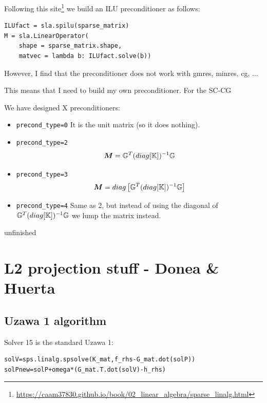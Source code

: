 Following this site\footnote{\url{https://caam37830.github.io/book/02_linear_algebra/sparse_linalg.html}}
we build an ILU preconditioner as follows:
\begin{lstlisting}
ILUfact = sla.spilu(sparse_matrix)
M = sla.LinearOperator(
    shape = sparse_matrix.shape,
    matvec = lambda b: ILUfact.solve(b))
\end{lstlisting}
However, I find that the preconditioner does not work with gmres, minres, cg, ...

This means that I need to build my own preconditioner. 
For the SC-CG 

We have designed X preconditioners:
\begin{itemize}
\item {\tt precond\_type=0} It is the unit matrix (so it does nothing). 

\item {\tt precond\_type=2}
\[
{\bm M} = {\mathbb{G}}^T (diag [{\mathbb{K}}]  )^{-1} {\mathbb{G}} 
\]
\item {\tt precond\_type=3} 
\[
{\bm M} = diag \left[ {\mathbb{G}}^T (diag [{\mathbb{K}}]  )^{-1} {\mathbb{G}} \right]
\]
\item {\tt precond\_type=4} Same as 2, but instead of using the 
diagonal of $ {\mathbb{G}}^T (diag [{\mathbb{K}}]  )^{-1} {\mathbb{G}}$ we lump the matrix instead.

\end{itemize}

{\color{red} \Large unfinished}

\newpage
\section*{L2 projection stuff - Donea \& Huerta}

\subsection*{Uzawa 1 algorithm}


Solver 15 is the standard Uzawa 1:
\begin{lstlisting}
solV=sps.linalg.spsolve(K_mat,f_rhs-G_mat.dot(solP))
solPnew=solP+omega*(G_mat.T.dot(solV)-h_rhs)         
\end{lstlisting}

